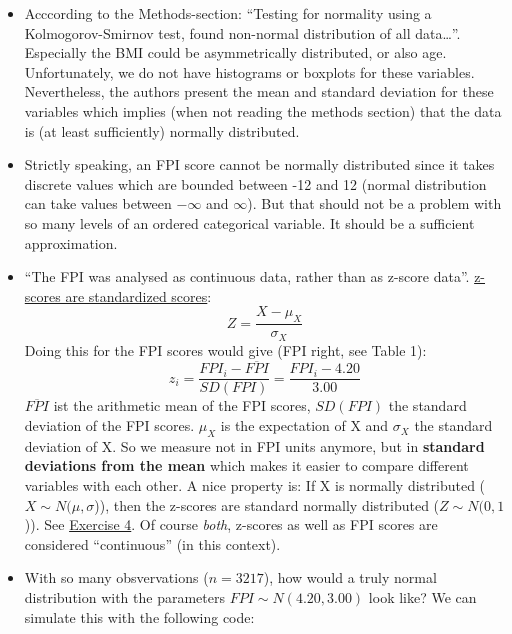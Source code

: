 \documentclass[
]{book}
\begin{document}
\begin{itemize}
\item
  Acccording to the Methods-section:
  ``Testing for normality using a Kolmogorov-Smirnov test,
  found non-normal distribution of all data\ldots{}''.
  Especially the BMI could be asymmetrically distributed, or also age. Unfortunately, we do not have
  histograms or boxplots for these variables. Nevertheless, the authors present the mean and standard deviation
  for these variables which implies (when not reading the methods section) that the data is (at least sufficiently)
  normally distributed.
\item
  Strictly speaking, an FPI score cannot be normally distributed since it takes discrete values which are bounded
  between -12 and 12 (normal distribution can take values between \(-\infty\) and \(\infty\)). But that should not be a problem with so many levels of an ordered categorical variable.
  It should be a sufficient approximation.
\item
  ``The FPI was analysed as continuous data, rather than as z-score data''.
  \href{https://www.youtube.com/watch?v=5S-Zfa-vOXs&ab_channel=KhanAcademy}{z-scores are standardized scores}:
  \[Z = \frac{X - \mu_X}{\sigma_X}\]
  Doing this for the FPI scores would give (FPI right, see Table 1):
  \[z_i = \frac{FPI_i - \overline{FPI}}{SD(FPI)} = \frac{FPI_i - 4.20}{3.00}\]
  \(\overline{FPI}\) ist the arithmetic mean of the FPI scores, \(SD(FPI)\) the standard deviation of the FPI scores.
  \(\mu_X\) is the expectation of X and \(\sigma_X\) the standard deviation of X.
  So we measure not in FPI units anymore, but in \textbf{standard deviations from the mean} which makes
  it easier to compare different variables with each other. A nice property is: If X is normally
  distributed (\(X \sim N(\mu, \sigma\))), then the z-scores are standard normally distributed (\(Z \sim N(0,1\))).
  See \hyperref[exercise4_descriptive_stats]{Exercise 4}. Of course \emph{both}, z-scores as well as FPI scores are
  considered ``continuous'' (in this context).
\item
  With so many obsvervations (\(n=3217\)), how would a truly normal distribution with the parameters
  \(FPI \sim N(4.20, 3.00)\) look like? We can simulate this with the following code:
\end{itemize}
\end{document}
